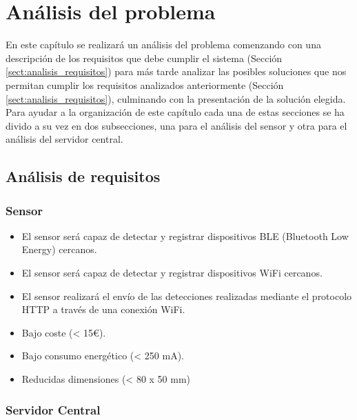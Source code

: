 \documentclass[../proyecto.tex]{subfiles}
\begin{document}
\chapter{Análisis del problema}\label{chap:analisis_del_problema}

En este capítulo se realizará un análisis del problema comenzando con una descripción de los requisitos que debe cumplir el sistema (Sección \autoref{sect:analisis_requisitos}) para más tarde analizar las posibles soluciones que nos permitan cumplir los requisitos analizados anteriormente (Sección \autoref{sect:analisis_requisitos}), culminando con la presentación de la solución elegida. Para ayudar a la organización de este capítulo cada una de estas secciones se ha divido a su vez en dos subsecciones, una para el análisis del sensor y otra para el análisis del servidor central.\\

\section{Análisis de requisitos}\label{sect:analisis_requisitos}

\subsection{Sensor}

\begin{itemize}
  \item El sensor será capaz de detectar y registrar dispositivos BLE (Bluetooth Low Energy) cercanos.
  \item El sensor será capaz de detectar y registrar dispositivos WiFi cercanos.
  \item El sensor realizará el envío de las detecciones realizadas mediante el protocolo HTTP a través de una conexión WiFi.
\end{itemize}

\begin{itemize}
  \item Bajo coste (< 15€).
  \item Bajo consumo energético (< 250 mA).
  \item Reducidas dimensiones (< 80 x 50 mm)
\end{itemize}


\subsection{Servidor Central}
\end{document}
